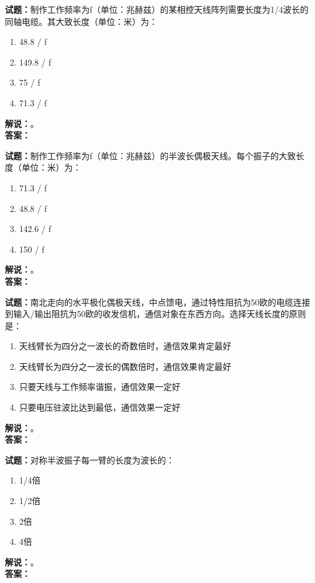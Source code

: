 \documentclass{ctexbook}
\begin{document}
\vspace{\baselineskip}

\noindent\textbf{试题：}制作工作频率为f（单位：兆赫兹）的某相控天线阵列需要长度为1/4波长的同轴电缆。其大致长度（单位：米）为：
\begin{enumerate}[leftmargin=3em]
  \item 48.8 / f
  \item 149.8 / f
  \item 75 / f
  \item 71.3 / f
\end{enumerate}
\noindent\textbf{解说：}\textbf{}。\\\noindent\textbf{答案：}

\vspace{\baselineskip}

\noindent\textbf{试题：}制作工作频率为f（单位：兆赫兹）的半波长偶极天线。每个振子的大致长度（单位：米）为：
\begin{enumerate}[leftmargin=3em]
  \item 71.3 / f
  \item 48.8 / f
  \item 142.6 / f
  \item 150 / f
\end{enumerate}
\noindent\textbf{解说：}\textbf{}。\\\noindent\textbf{答案：}

\vspace{\baselineskip}

\noindent\textbf{试题：}南北走向的水平极化偶极天线，中点馈电，通过特性阻抗为50欧的电缆连接到输入/输出阻抗为50欧的收发信机，通信对象在东西方向。选择天线长度的原则是：
\begin{enumerate}[leftmargin=3em]
  \item 天线臂长为四分之一波长的奇数倍时，通信效果肯定最好
  \item 天线臂长为四分之一波长的偶数倍时，通信效果肯定最好
  \item 只要天线与工作频率谐振，通信效果一定好
  \item 只要电压驻波比达到最低，通信效果一定好
\end{enumerate}
\noindent\textbf{解说：}\textbf{}。\\\noindent\textbf{答案：}

\vspace{\baselineskip}

\noindent\textbf{试题：}对称半波振子每一臂的长度为波长的：
\begin{enumerate}[leftmargin=3em]
  \item 1/4倍
  \item 1/2倍
  \item 2倍
  \item 4倍
\end{enumerate}
\noindent\textbf{解说：}\textbf{}。\\\noindent\textbf{答案：}
\end{document}
